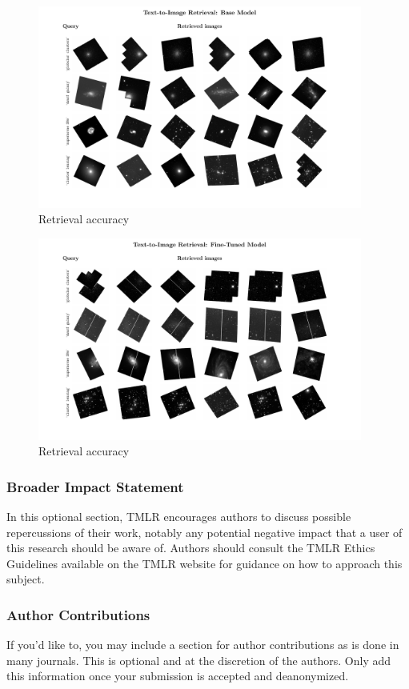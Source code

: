 \documentclass[10pt]{article} %
\begin{document}
\begin{figure}[!h]
\includegraphics[width=0.95\textwidth]{plots/tti_base.pdf}
\caption{Retrieval accuracy}
\label{fig:tti}
\end{figure}

\begin{figure}[!h]
\includegraphics[width=0.95\textwidth]{plots/tti.pdf}
\caption{Retrieval accuracy}
\label{fig:tti_base}
\end{figure}

\subsubsection*{Broader Impact Statement}
In this optional section, TMLR encourages authors to discuss possible repercussions of their work,
notably any potential negative impact that a user of this research should be aware of. 
Authors should consult the TMLR Ethics Guidelines available on the TMLR website
for guidance on how to approach this subject.

\subsubsection*{Author Contributions}
If you'd like to, you may include a section for author contributions as is done
in many journals. This is optional and at the discretion of the authors. Only add
this information once your submission is accepted and deanonymized. 
\end{document}
